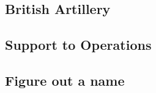 \documentclass[noraggedright]{turabian-researchpaper}
\begin{document}


	\subsection{British Artillery} %

	\subsection{Support to Operations}
		



		

	\subsection{Figure out a name} %
\end{document}
